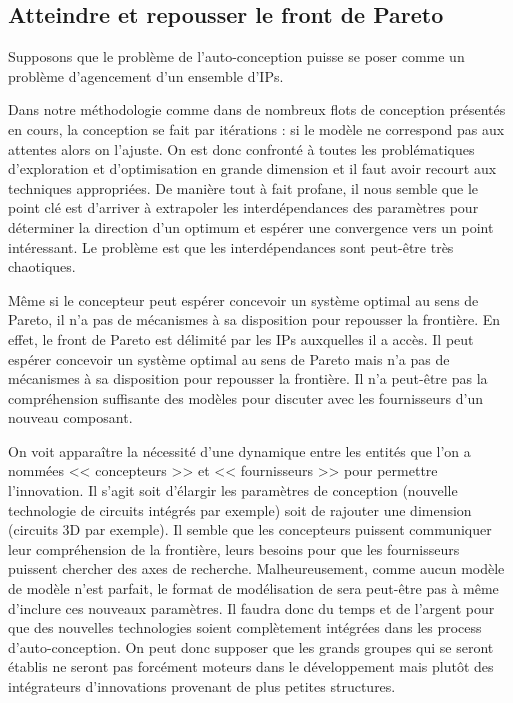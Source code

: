 \subsection{Atteindre et repousser le front de Pareto}

Supposons que le problème de l'auto-conception puisse se poser comme un problème
d'agencement d'un ensemble d'IPs.

Dans notre méthodologie comme dans de nombreux flots de conception présentés en
cours, la conception se fait par itérations : si le modèle ne correspond pas aux
attentes alors on l'ajuste. On est donc confronté à toutes les problématiques
d'exploration et d'optimisation en grande dimension et il faut avoir recourt aux
techniques appropriées. De manière tout à fait profane, il nous semble que le
point clé est d'arriver à extrapoler les interdépendances des paramètres pour
déterminer la direction d'un optimum et espérer une convergence vers un point
intéressant. Le problème est que les interdépendances sont peut-être très
chaotiques.

Même si le concepteur peut espérer concevoir un système optimal au sens de
Pareto, il n'a pas de mécanismes à sa disposition pour repousser la frontière.
En effet, le front de Pareto est délimité par les IPs auxquelles il a accès.
Il peut espérer concevoir un système optimal au sens de Pareto mais n'a pas de
mécanismes à sa disposition pour repousser la frontière. Il n'a peut-être pas la
compréhension suffisante des modèles pour discuter avec les fournisseurs d'un
nouveau composant.

On voit apparaître la nécessité d'une dynamique entre les entités que l'on a
nommées << concepteurs >> et << fournisseurs >> pour permettre l'innovation.
Il s'agit soit d'élargir les paramètres de conception (nouvelle technologie de
circuits intégrés par exemple) soit de rajouter une dimension (circuits 3D par
exemple). Il semble que les concepteurs puissent communiquer leur compréhension
de la frontière, leurs besoins pour que les fournisseurs puissent chercher des
axes de recherche. Malheureusement, comme aucun modèle de modèle n'est parfait,
le format de modélisation de sera peut-être pas à même d'inclure ces nouveaux
paramètres. Il faudra donc du temps et de l'argent pour que des nouvelles
technologies soient complètement intégrées dans les process d'auto-conception.
On peut donc supposer que les grands groupes qui se seront établis ne seront pas
forcément moteurs dans le développement mais plutôt des intégrateurs
d'innovations provenant de plus petites structures.

